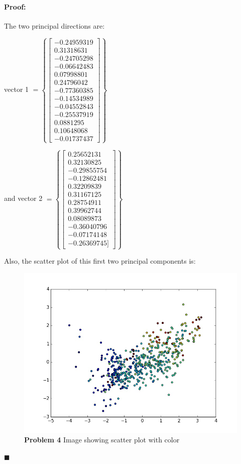 \documentclass[12pt]{article}
\newenvironment{proof}{\paragraph{Proof: }}{\hfill$\blacksquare$}
\begin{document}
\begin{proof}

The two principal directions are:

vector 1 $= \left\{ \left[ \begin{matrix} -0.24959319 \\ 0.31318631 \\ -0.24705298 \\ -0.06642483 \\ 0.07998801 \\ 0.24796042 \\ -0.77360385 \\ -0.14534989 \\ -0.04552843 \\ -0.25537919 \\ 0.0881295 \\ 0.10648068 \\ -0.01737437 \end{matrix}\right] \right\}$

and vector 2 $ = \left\{ \left[ \begin{matrix}  0.25652131 \\ 0.32130825\\ -0.29855754 \\-0.12862481 \\ 0.32209839 \\  0.31167125\\ 0.28754911 \\ 0.39962744 \\ 0.08089873 \\-0.36040796\\ -0.07174148\\ -0.26369745] \end{matrix}\right] \right\}$


Also, the scatter plot of this first two principal components is:

\begin{figure}[!htbp]
\centering
\includegraphics[width = 13cm]{PCA_2.jpg}
\caption{\textbf{Problem 4} Image showing scatter plot with color}
\end{figure}

\end{proof}
\end{document}

